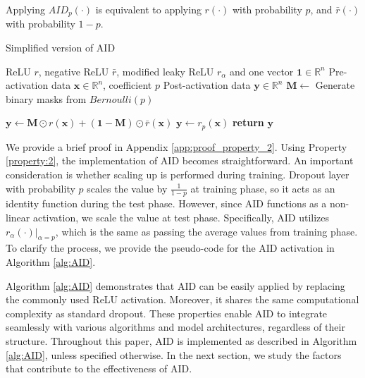 \begin{property}
\label{property:2}
Applying $AID_p(\cdot)$ is equivalent to applying $r(\cdot)$ with probability $p$, and $\bar{r}(\cdot)$ with probability $1-p$.
\end{property}

\begin{algorithm}[b]
   \caption{Simplified version of AID}
   \label{alg:AID}
\begin{algorithmic}
     ReLU $r$, negative ReLU $\bar r$, modified leaky ReLU $r_\alpha$ and one vector $\mathbf 1\in \mathbb R^n$
    Pre-activation data $\mathbf{x}\in \mathbb R^n$, coefficient $p$
    Post-activation data $\mathbf{y} \in \mathbb R^n$
      \STATE $\mathbf{M}\leftarrow$ Generate binary masks  from $Bernoulli(p)$

      \STATE $\mathbf y \leftarrow \mathbf M \odot r(\mathbf{x}) + (\mathbf 1-\mathbf M) \odot \bar r(\mathbf x)$ 
      \STATE $\mathbf y \leftarrow r_p(\mathbf x)$
   \ENDIF
   \STATE \textbf{return} $\mathbf{y}$
\end{algorithmic}
\end{algorithm}
We provide a brief proof in Appendix \ref{app:proof_property_2}.
Using Property \ref{property:2}, the implementation of AID becomes straightforward.
An important consideration is whether scaling up is performed during training.
Dropout layer with probability $p$ scales the value by $\frac{1}{1-p}$ at training phase, so it acts as an identity function during the test phase.
However, since AID functions as a non-linear activation, we scale the value at test phase.
Specifically, AID utilizes $r_\alpha(\cdot)|_{\alpha=p}$, which is the same as passing the average values from training phase.
To clarify the process, we provide the pseudo-code for the AID activation in Algorithm \ref{alg:AID}.


Algorithm \ref{alg:AID} demonstrates that AID can be easily applied by replacing the commonly used ReLU activation.
Moreover, it shares the same computational complexity as standard dropout.
These properties enable AID to integrate seamlessly with various algorithms and model architectures, regardless of their structure.
Throughout this paper, AID is implemented as described in Algorithm \ref{alg:AID}, unless specified otherwise.
In the next section, we study the factors that contribute to the effectiveness of AID.




